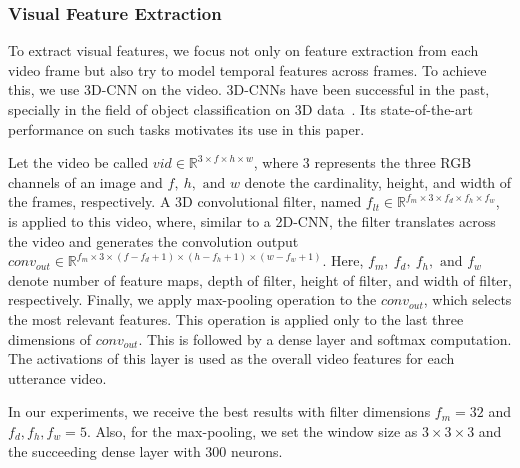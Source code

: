 \documentclass[review]{elsarticle}
\newcommand\?[1]{\hl{#1}}
\begin{document}

\subsubsection{Visual Feature Extraction}
\label{visual}

To extract visual features, we focus not only on feature extraction from each
video frame but also try to model temporal features across frames. To achieve
this, we use 3D-CNN on the video. 3D-CNNs have been successful in the past,
specially in the field of object classification on 3D data~\citep{ji20133d}. Its
state-of-the-art performance on such tasks motivates its use in this paper.

Let the video be called $vid \in \mathbb{R}^{3\times f\times h\times w}$, where
$3$ represents the three RGB channels of an image and $f,\ h,\text{ and }w$
denote the cardinality, height, and width of the frames, respectively. A 3D
convolutional filter, named $f_{lt}\in \mathbb{R}^{f_m\times 3\times f_d\times
f_h\times f_w}$, is applied to this video, where, similar to a 2D-CNN, the
filter translates across the video and generates the convolution output
$conv_{out} \in \mathbb{R}^{f_m\times 3\times (f-f_d+1)\times (h-f_h+1)\times
(w-f_w+1)}$. Here, $f_m,\ f_d,\ f_h,\text{ and }f_w$ denote number of feature
maps, depth of filter, height of filter, and width of filter,
respectively. Finally, we apply max-pooling operation to the $conv_{out}$, which
selects the most relevant features. This operation is applied only to the last
three dimensions of $conv_{out}$. This is followed by a dense layer and softmax
computation. The activations of this layer is used as the overall video features
for each utterance video.

In our experiments, we receive the best results with filter dimensions $f_m =
32$ and $f_d,f_h,f_w = 5$. Also, for the max-pooling, we set the window size as
$3\times 3\times 3$ and the succeeding dense layer with $300$ neurons.



\end{document}
